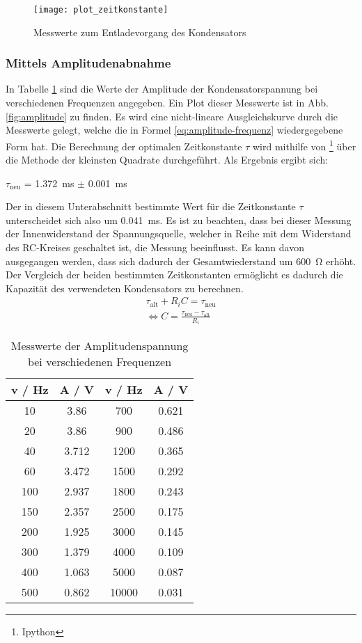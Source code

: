 \begin{figure}
\centering
\texttt{[image: plot\_zeitkonstante]}
\caption{Messwerte zum Entladevorgang des Kondensators}
\label{fig:zur_zeitkonstante}
\end{figure}

\subsubsection{Mittels Amplitudenabnahme}
In Tabelle \ref{tab:messwerte_amplituden} sind die Werte der Amplitude der Kondensatorspannung bei verschiedenen Frequenzen angegeben. Ein Plot dieser Messwerte ist in Abb. \ref{fig:amplitude} zu finden. Es wird eine nicht-lineare Ausgleichskurve durch die Messwerte gelegt, welche die in Formel \eqref{eq:amplitude-frequenz} wiedergegebene Form hat. Die Berechnung der optimalen Zeitkonstante $\tau$ wird mithilfe von \footnote{Ipython} über die Methode der kleinsten Quadrate durchgeführt. Als Ergebnis ergibt sich: 
\begin{center}
$\tau_\text{neu}$ = \SI{1.372}{\milli\second} $\pm$ \SI{0.001}{\milli\second}
\end{center}
Der in diesem Unterabschnitt bestimmte Wert für die Zeitkonstante $\tau$ unterscheidet sich also um \SI{0.041}{\milli\second}. Es ist zu beachten, dass bei dieser Messung der Innenwiderstand der Spannungsquelle, welcher in Reihe mit dem Widerstand des RC-Kreises geschaltet ist, die Messung beeinflusst. Es kann davon ausgegangen werden, dass sich dadurch der Gesamtwiederstand um \SI{600}{\ohm} erhöht. Der Vergleich der beiden bestimmten Zeitkonstanten ermöglicht es dadurch die Kapazität des verwendeten Kondensators zu berechnen.
\begin{equation*}
  \begin{split}
    \tau_\text{alt} + R_i C = \tau_\text{neu}\\
	\Leftrightarrow C = \frac{\tau_\text{neu} - \tau_\text{alt}}{R_i}
  \end{split}
\end{equation*}
\begin{table}
  \centering
  \begin{tabular}{c|c|c|c}
    \toprule
    v / Hz & A / V & v / Hz & A / V \\
    \midrule
     10 &3.86 &700 &0.621 \\
     20 & 3.86 &900 &0.486 \\
     40 &3.712 &1200& 0.365 \\
     60 &3.472 &1500& 0.292 \\
    100& 2.937 &1800& 0.243 \\
    150& 2.357 &2500& 0.175 \\
    200& 1.925 &3000& 0.145 \\
    300& 1.379 &4000& 0.109 \\
    400& 1.063 &5000& 0.087 \\
    500& 0.862 &10000& 0.031 \\ 
 \bottomrule
  \end{tabular}
  \caption{Messwerte der Amplitudenspannung bei verschiedenen Frequenzen}
  \label{tab:messwerte_amplituden}
\end{table}
